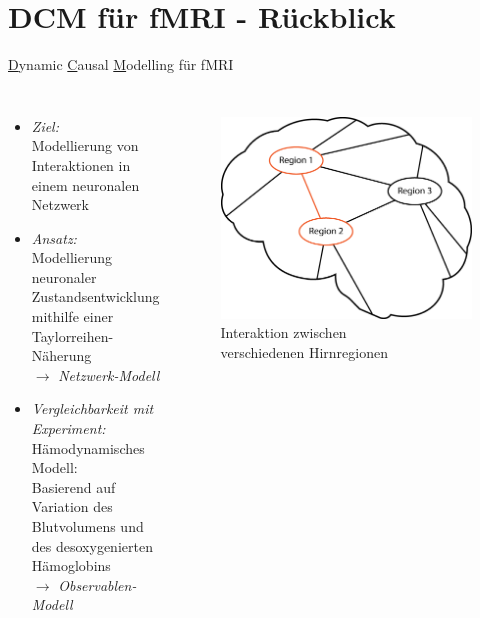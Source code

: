 \documentclass{beamer}
\begin{document}
\section{DCM für fMRI - Rückblick}
\begin{frame}[t]{\underline{D}ynamic \underline{C}ausal \underline{M}odelling für fMRI}
	\begin{columns}
		\column[t]{8.3cm}
		\vspace{-0.7 cm}
		\begin{itemize}
			\item \textit{Ziel:} \\Modellierung von Interaktionen in einem neuronalen Netzwerk\\[0.3cm]
			\item \textit{Ansatz:} \\Modellierung neuronaler Zustandsentwicklung mithilfe einer Taylorreihen-Näherung\\$ \longrightarrow $ \textit{Netzwerk-Modell}\\[0.3cm]
			\item \textit{Vergleichbarkeit mit Experiment:} \\ Hämodynamisches Modell:\\ Basierend auf Variation des Blutvolumens und des desoxygenierten Hämoglobins\\$ \longrightarrow $ \textit{Observablen-Modell}
		\end{itemize}
		\column[t]{4.5cm}
			\vspace{-0.3 cm}
			\begin{figure}
				\centering
				\includegraphics[width=0.9\linewidth]{res/brain_01.eps}
				\\ {\footnotesize Interaktion zwischen}\\ {\footnotesize verschiedenen Hirnregionen}
			\label{fig:brain_01}
		\end{figure}
	\end{columns}

\end{frame}
\end{document}
